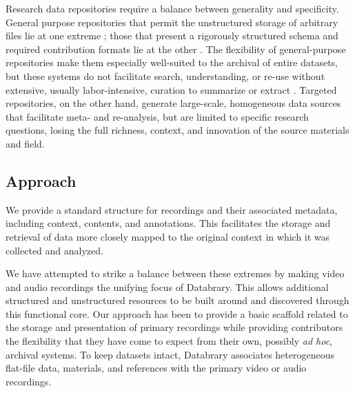 \documentclass{sig-alternate}
\begin{document}
Research data repositories require a balance between generality and specificity.
General purpose repositories that permit the unstructured storage of arbitrary files lie at one extreme \cite{dataverse, dryad, purr}; those that present a rigorously structured schema and required contribution formats lie at the other \cite{HCP, PGP, talkbank}.
The flexibility of general-purpose repositories make them especially well-suited to the archival of entire datasets, but these systems do not facilitate search, understanding, or re-use without extensive, usually labor-intensive, curation to summarize or extract \cite{Peer_2012}.
Targeted repositories, on the other hand, generate large-scale, homogeneous data sources that facilitate meta- and re-analysis, but are limited to specific research questions, losing the full richness, context, and innovation of the source materials and field.

\subsection{Approach}
We provide a standard structure for recordings and their associated metadata, including context, contents, and annotations.
This facilitates the storage and retrieval of data more closely mapped to the original context in which it was collected and analyzed.

We have attempted to strike a balance between these extremes by making video and audio recordings the unifying focus of Databrary.
This allows additional structured and unstructured resources to be built around and discovered through this functional core.
Our approach has been to provide a basic scaffold related to the storage and presentation of primary recordings while providing contributors the flexibility that they have come to expect from their own, possibly \emph{ad hoc}, archival systems.
To keep datasets intact, Databrary associates heterogeneous flat-file data, materials, and references with the primary video or audio recordings.
\end{document}
